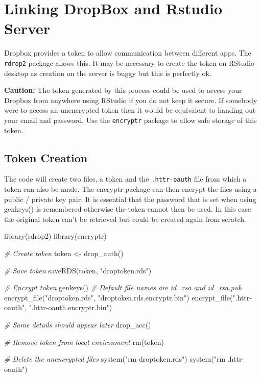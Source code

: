 \documentclass[
]{book}
\newenvironment{Shaded}{\begin{snugshade}}{\end{snugshade}}
\newcommand{\CommentTok}[1]{\textcolor[rgb]{0.56,0.35,0.01}{\textit{#1}}}
\newcommand{\FunctionTok}[1]{\textcolor[rgb]{0.00,0.00,0.00}{#1}}
\newcommand{\NormalTok}[1]{#1}
\newcommand{\OtherTok}[1]{\textcolor[rgb]{0.56,0.35,0.01}{#1}}
\newcommand{\StringTok}[1]{\textcolor[rgb]{0.31,0.60,0.02}{#1}}
\begin{document}
\hypertarget{linking-dropbox-and-rstudio-server}{%
\section{Linking DropBox and Rstudio Server}\label{linking-dropbox-and-rstudio-server}}

Dropbox provides a token to allow communication between different apps. The \texttt{rdrop2} package allows this. It may be necessary to create the token on RStudio desktop as creation on the server is buggy but this is perfectly ok.

\textbf{Caution:} The token generated by this process could be used to access your Dropbox from anywhere using RStudio if you do not keep it secure. If somebody were to access an unencrypted token then it would be equivalent to handing out your email and password. Use the \texttt{encryptr} package to allow safe storage of this token.

\hypertarget{token-creation}{%
\subsection{Token Creation}\label{token-creation}}

The code will create two files, a token and the \texttt{.httr-oauth} file from which a token can also be made. The encryptr package can then encrypt the files using a public / private key pair. It is essential that the password that is set when using genkeys() is remembered otherwise the token cannot then be used. In this case the original token can't be retrieved but could be created again from scratch.

\begin{Shaded}
\begin{Highlighting}[]
\FunctionTok{library}\NormalTok{(rdrop2)}
\FunctionTok{library}\NormalTok{(encryptr)}
 
\CommentTok{\# Create token}
\NormalTok{token }\OtherTok{\textless{}{-}} \FunctionTok{drop\_auth}\NormalTok{()}
 
\CommentTok{\# Save token}
\FunctionTok{saveRDS}\NormalTok{(token, }\StringTok{"droptoken.rds"}\NormalTok{)}
 
\CommentTok{\# Encrypt token}
\FunctionTok{genkeys}\NormalTok{()               }\CommentTok{\# Default file names are id\_rsa and id\_rsa.pub}
\FunctionTok{encrypt\_file}\NormalTok{(}\StringTok{"droptoken.rds"}\NormalTok{, }\StringTok{"droptoken.rds.encryptr.bin"}\NormalTok{)}
\FunctionTok{encrypt\_file}\NormalTok{(}\StringTok{".httr{-}oauth"}\NormalTok{, }\StringTok{".httr{-}oauth.encryptr.bin"}\NormalTok{)}
 
\CommentTok{\# Same details should appear later}
\FunctionTok{drop\_acc}\NormalTok{()}
 
\CommentTok{\# Remove token from local environment}
\FunctionTok{rm}\NormalTok{(token)}
 
 
\CommentTok{\# Delete the unencrypted files}
\FunctionTok{system}\NormalTok{(}\StringTok{"rm droptoken.rds"}\NormalTok{)}
\FunctionTok{system}\NormalTok{(}\StringTok{"rm .httr{-}oauth"}\NormalTok{)}
\end{Highlighting}
\end{Shaded}
\end{document}
